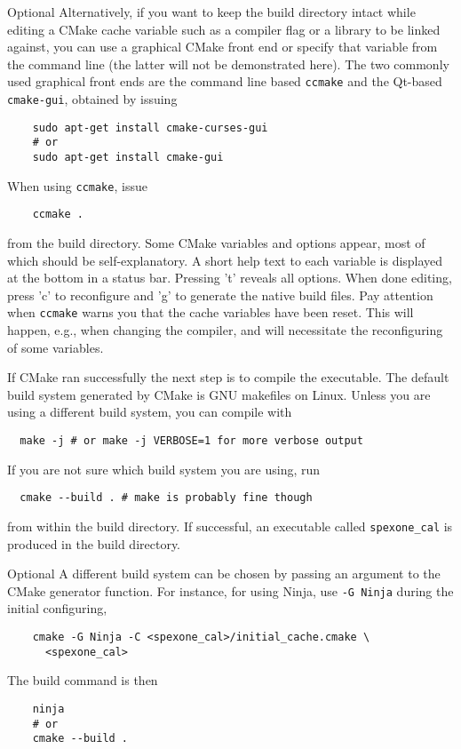\documentclass{article}
\begin{document}
\begin{titlebox}{Optional}
  Alternatively, if you want to keep the build directory intact while editing a CMake cache variable such as a compiler flag or a library to be linked against, you can use a graphical CMake front end or specify that variable from the command line (the latter will not be demonstrated here). The two commonly used graphical front ends are the command line based \lstinline!ccmake! and the Qt-based \lstinline!cmake-gui!, obtained by issuing
  \begin{lstlisting}
    sudo apt-get install cmake-curses-gui
    # or
    sudo apt-get install cmake-gui
  \end{lstlisting}
  When using \lstinline!ccmake!, issue
  \begin{lstlisting}
    ccmake .
  \end{lstlisting}
  from the build directory. Some CMake variables and options appear, most of which should be self-explanatory. A short help text to each variable is displayed at the bottom in a status bar. Pressing 't' reveals all options. When done editing, press 'c' to reconfigure and 'g' to generate the native build files. Pay attention when \lstinline!ccmake! warns you that the cache variables have been reset. This will happen, e.g., when changing the compiler, and will necessitate the reconfiguring of some variables.
\end{titlebox}
If CMake ran successfully the next step is to compile the executable. The default build system generated by CMake is GNU makefiles on Linux. Unless you are using a different build system, you can compile with
\begin{lstlisting}
  make -j # or make -j VERBOSE=1 for more verbose output
\end{lstlisting}
If you are not sure which build system you are using, run
\begin{lstlisting}
  cmake --build . # make is probably fine though
\end{lstlisting}
from within the build directory. If successful, an executable called \lstinline!spexone_cal! is produced in the build directory.

\begin{titlebox}{Optional}
  A different build system can be chosen by passing an argument to the CMake generator function. For instance, for using Ninja, use \lstinline!-G Ninja! during the initial configuring,
  \begin{lstlisting}
    cmake -G Ninja -C <spexone_cal>/initial_cache.cmake \
      <spexone_cal>
  \end{lstlisting}
  The build command is then
  \begin{lstlisting}
    ninja
    # or
    cmake --build .
  \end{lstlisting}
\end{titlebox}
\end{document}
